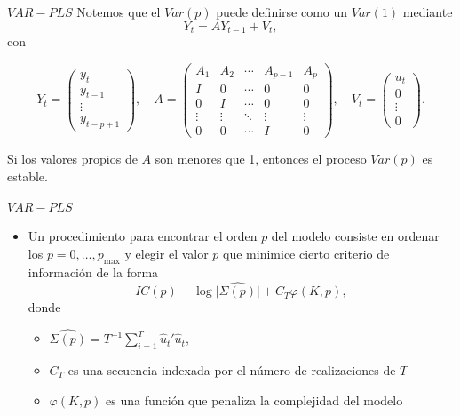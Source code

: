 \documentclass{beamer}
\newcommand{\?}{?`}
\begin{document}
\begin{frame}{$VAR-PLS$}
  Notemos que el $Var(p)$ puede definirse como un $Var(1)$ mediante 
    \begin{displaymath}
      Y_t=AY_{t-1} + V_t,
    \end{displaymath}
    con
    \begin{small}
    \begin{displaymath}
      Y_t=\left(
        \begin{array}{c}
          y_t \\
          y_{t-1} \\
          \vdots \\
          y_{t-p+1}
        \end{array}
        \right), \quad
        A=\left(
        \begin{array}{ccccc}
          A_1 & A_2 & \cdots & A_{p-1} & A_p \\
          I & 0 & \cdots & 0 & 0 \\
          0 & I & \cdots & 0 & 0 \\
          \vdots & \vdots & \ddots & \vdots & \vdots \\
          0 & 0 & \cdots & I & 0
        \end{array}
        \right), \quad
        V_t=\left(
        \begin{array}{c}
          u_t \\
          0 \\
          \vdots \\
          0
        \end{array}
        \right).
    \end{displaymath}
    \end{small}
    Si los valores propios de $A$ son menores que 1, entonces el
    proceso $Var(p)$ es estable.
\end{frame}

\begin{frame}{$VAR-PLS$}
  \begin{itemize}
  \item Un procedimiento para encontrar el orden $p$ del modelo
    consiste en ordenar los $p=0,\ldots,p_{\max}$ y elegir el valor
    $p$ que minimice cierto criterio de informaci\'on de la forma
    \begin{displaymath}
      IC(p)-\log \vert \hat{\Sigma(p)} \vert + C_T \varphi(K,p),
    \end{displaymath}
    donde
    \begin{itemize}
      \item $\hat{\Sigma(p)}=T^{-1} \sum_{i=1}^T\hat{u}_t'\hat{u}_t$,
      \item $C_T$ es una secuencia indexada por el n\'umero de
        realizaciones de $T$
      \item $\varphi(K,p)$ es una funci\'on que penaliza la
        complejidad del modelo
    \end{itemize}
  \end{itemize}
\end{frame}
\end{document}
